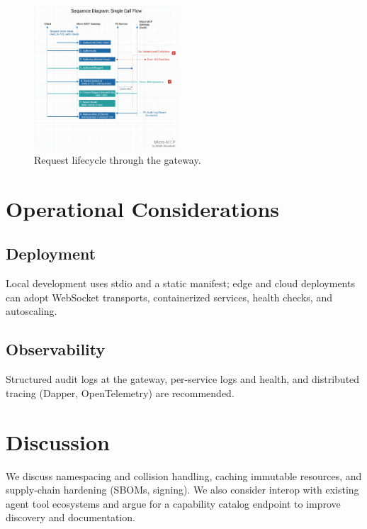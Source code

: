 \documentclass[conference]{IEEEtran}
\begin{document}
\begin{figure}[t]
  \centering
  \includegraphics[width=0.48\textwidth]{figures/request-lifecycle-sequence-diagram.png}
  \caption{Request lifecycle through the gateway.}
  \label{fig:lifecycle}
\end{figure}

\section{Operational Considerations}
\subsection{Deployment}
Local development uses stdio and a static manifest; edge and cloud deployments can adopt WebSocket transports, containerized services, health checks, and autoscaling.

\subsection{Observability}
Structured audit logs at the gateway, per-service logs and health, and distributed tracing (Dapper\cite{dapper}, OpenTelemetry\cite{otel}) are recommended.

\section{Discussion}
We discuss namespacing and collision handling, caching immutable resources, and supply-chain hardening (SBOMs, signing). We also consider interop with existing agent tool ecosystems and argue for a capability catalog endpoint to improve discovery and documentation.
\end{document}
